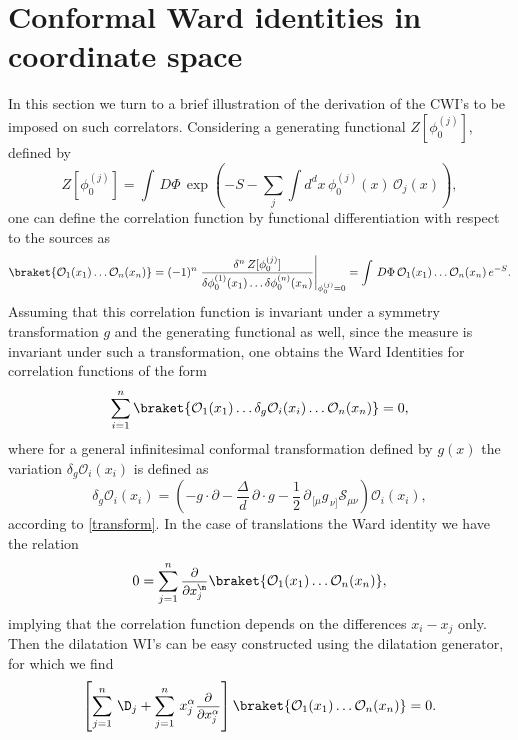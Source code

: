 \documentclass[a4paper,11pt,openright,twoside]{book}
\newcommand{\mO}{\mathcal{O}}
\let\a=\alpha   \let\b=\beta   \let\g=\gamma   \let\d=\delta
\newcommand{\sdfrac}[2]{\mbox{\small$\displaystyle\frac{#1}{#2}$}}
\numberwithin{equation}{section}
\begin{document}
\section{Conformal Ward identities  in coordinate space}\label{CWIposition}
In this section we turn to a brief illustration of the derivation of the CWI's to be imposed on such correlators.
Considering a generating functional $Z[\phi_0^{(j)}]$, defined by
\begin{equation}
	Z\left[\phi_0^{(j)}\right]=\int\,D\Phi\,\exp\left(-S-\sum_{j}\int d^dx\,\phi_0^{(j)}(x)\,\mathcal{O}_j(x)\right),
\end{equation}	
one can define the correlation function by functional differentiation with respect to the sources as
\begin{align}
	\braket{\mathcal{O}_1(x_1)\dots \mathcal{O}_n(x_n)}=(-1)^n\left.\frac{\delta^n\,Z[\phi_0^{(j)}]}{\delta \phi_0^{(1)}(x_1)\dots\delta\phi_0^{(n)}(x_n)}\right|_{\phi_0^{(j)}=0}=\int\,D\Phi\,\mathcal{O}_1(x_1)\dots \mathcal{O}_n(x_n)\,e^{-S}.
\end{align}
Assuming that this correlation function is invariant under a symmetry transformation $g$ and the generating functional as well, since the measure is invariant under such a transformation, one obtains the Ward Identities for correlation functions of the form
\begin{equation}
	\sum_{i=1}^n\braket{\mathcal{O}_1(x_1)\dots\delta_g\mathcal{O}_i(x_i) \dots\mathcal{O}_n(x_n)}=0,\label{globalW}
\end{equation} 
where for a general infinitesimal conformal transformation defined by $g(x)$ the variation $\delta_g\mathcal{O}_i(x_i)$ is defined as
\begin{equation}
	\delta_g\mathcal{O}_i(x_i)=\left(-g\cdot\partial-\frac{\Delta}{d}\,\partial\cdot g-\frac{1}{2}\,\partial_{\,[\mu}g_{\,\nu]}\mathcal{S}_{\mu\nu}\right)\mathcal{O}_i(x_i),\label{transfSpecial}
\end{equation}
according to \eqref{transform}. In the case of translations the Ward identity we have the relation
\begin{equation}
	0=\sum_{j=1}^n\sdfrac{\partial}{\partial x_j^\m}\braket{\mO_1(x_1)\dots\mO_n(x_n)},
\end{equation}
implying that the correlation function depends on the differences $x_i-x_j$ only. Then the dilatation WI's can be easy constructed using the dilatation generator, for which we find
\begin{equation}
	\left[\sum_{j=1}^n\,\D_j+\sum_{j=1}^n\,x_j^\a\sdfrac{\partial}{\partial x_j^\a}\right]\braket{\mO_1(x_1)\dots\mO_n(x_n)}=0.
\end{equation}
\end{document}
